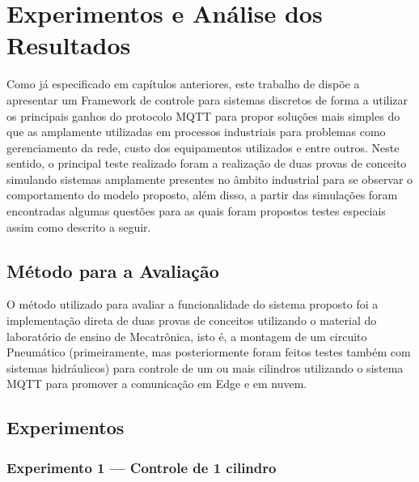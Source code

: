 \newpage
\chapter[Experimentos e Análise dos Resultados]{Experimentos e Análise dos Resultados}
\label{experimentos}

Como já especificado em capítulos anteriores, este trabalho de dispõe a apresentar um Framework de 
 controle para sistemas discretos de forma a utilizar os principais ganhos do protocolo \ac{MQTT} para propor soluções mais 
 simples do que as amplamente utilizadas em processos industriais para problemas como gerenciamento da rede, custo dos 
 equipamentos utilizados e entre outros. Neste sentido, o principal teste realizado foram a realização de duas provas de
 conceito simulando sistemas amplamente presentes no âmbito industrial para se observar o comportamento do modelo 
 proposto, além disso, a partir das simulações foram encontradas algumas questões para as quais foram propostos testes 
 especiais assim como descrito a seguir.

\section{Método para a Avaliação}
\label{metodo}

O método utilizado para avaliar a funcionalidade do sistema proposto foi a implementação direta de duas provas de 
conceitos utilizando o material do laboratório de ensino de Mecatrônica, isto é, a montagem de um circuito Pneumático 
(primeiramente, mas posteriormente foram feitos testes também com sistemas hidráulicos) para controle de um ou mais 
cilindros utilizando o sistema \ac{MQTT} para promover a comunicação em Edge e em nuvem.

\section{Experimentos}

\subsection{Experimento 1 — Controle de 1 cilindro}

